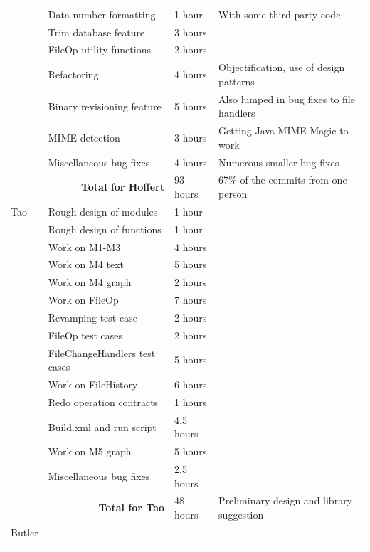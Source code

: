 \documentclass[12pt,a4paper]{article}
\begin{document}
\begin{longtable}{| p{2cm} | p{5cm} | p{3cm}| p{4.5cm} |}
   & Data number formatting & 1 hour & With some third party code\\ \cline{2-4}
   & Trim database feature & 3 hours & \\ \cline{2-4}
   & FileOp utility functions & 2 hours & \\ \cline{2-4}
   & Refactoring & 4 hours & Objectification, use of design patterns \\ \cline{2-4}
   & Binary revisioning feature & 5 hours & Also lumped in bug fixes to file handlers \\ \cline{2-4}
   & MIME detection & 3 hours & Getting Java MIME Magic to work\\ \cline{2-4}
   & Miscellaneous bug fixes & 4 hours & Numerous smaller bug fixes\\ \hline
  \multicolumn{2}{|r|}{\textbf{Total for Hoffert}} & 93 hours & 67\% of the commits from one person\\ \hline \hline
  Tao & Rough design of modules & 1 hour & \\ \cline{2-4}
   & Rough design of functions & 1 hour & \\ \cline{2-4}
   & Work on M1-M3 & 4 hours & \\ \cline{2-4}
   & Work on M4 text & 5 hours & \\ \cline{2-4}
   & Work on M4 graph & 2 hours & \\ \cline{2-4}
   & Work on FileOp & 7 hours & \\ \cline{2-4}
   & Revamping test case & 2 hours & \\ \cline{2-4}
   & FileOp test cases & 2 hours & \\ \cline{2-4}
   & FileChangeHandlers \newline test cases & 5 hours & \\ \cline{2-4}
   & Work on FileHistory & 6 hours & \\ \cline{2-4}
   & Redo operation contracts & 1 hours & \\ \cline{2-4}
   & Build.xml and run script & 4.5 hours & \\ \cline{2-4}
   & Work on M5 graph & 5 hours & \\ \cline{2-4}
   & Miscellaneous bug fixes & 2.5 hours & \\ \hline
  \multicolumn{2}{|r|}{\textbf{Total for Tao}}  & 48 hours & Preliminary design and library suggestion \\ \hline \hline
  Butler &  &  & \\ \cline{2-4}
   &  &  & \\ \cline{2-4}

\end{longtable}
\end{document}
